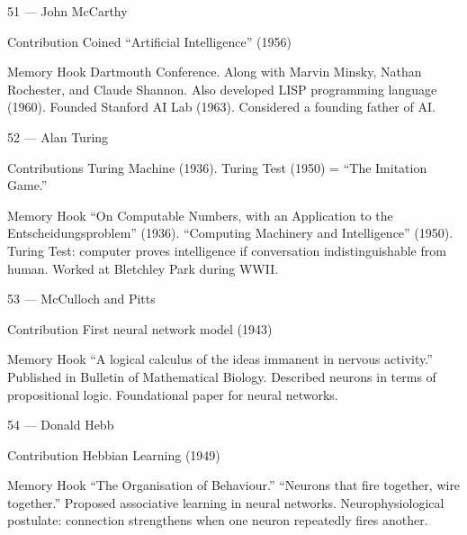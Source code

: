 \documentclass[aspectratio=169,8pt]{beamer}
\begin{document}
	\begin{frame}{51 --- John McCarthy}
		\begin{block}{Contribution}
			Coined ``Artificial Intelligence'' (1956)
		\end{block}
		\begin{block}{Memory Hook}
			Dartmouth Conference. Along with Marvin Minsky, Nathan Rochester, and Claude Shannon. Also developed LISP programming language (1960). Founded Stanford AI Lab (1963). Considered a founding father of AI.
		\end{block}
	\end{frame}
	
	\begin{frame}{52 --- Alan Turing}
		\begin{block}{Contributions}
			Turing Machine (1936). Turing Test (1950) = ``The Imitation Game.''
		\end{block}
		\begin{block}{Memory Hook}
			``On Computable Numbers, with an Application to the Entscheidungsproblem'' (1936). ``Computing Machinery and Intelligence'' (1950). Turing Test: computer proves intelligence if conversation indistinguishable from human. Worked at Bletchley Park during WWII.
		\end{block}
	\end{frame}
	
	\begin{frame}{53 --- McCulloch and Pitts}
		\begin{block}{Contribution}
			First neural network model (1943)
		\end{block}
		\begin{block}{Memory Hook}
			``A logical calculus of the ideas immanent in nervous activity.'' Published in Bulletin of Mathematical Biology. Described neurons in terms of propositional logic. Foundational paper for neural networks.
		\end{block}
	\end{frame}
	
	\begin{frame}{54 --- Donald Hebb}
		\begin{block}{Contribution}
			Hebbian Learning (1949)
		\end{block}
		\begin{block}{Memory Hook}
			``The Organisation of Behaviour.'' ``Neurons that fire together, wire together.'' Proposed associative learning in neural networks. Neurophysiological postulate: connection strengthens when one neuron repeatedly fires another.
		\end{block}
	\end{frame}
	
\end{document}
